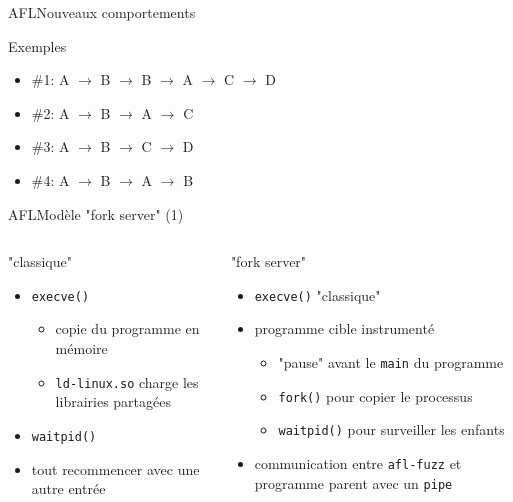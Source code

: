 \begin{frame}{AFL}{Nouveaux comportements}
  {\Large \centerline{Exemples}}

  \hspace{20.5cm}

  \begin{itemize}
    \item{\#1: A $\rightarrow$ B $\rightarrow$ B $\rightarrow$ A $\rightarrow$ C $\rightarrow$ D} \pause
    \item{\#2: A $\rightarrow$ B $\rightarrow$ A $\rightarrow$ C} \pause
    \item{\#3: A $\rightarrow$ B $\rightarrow$ C $\rightarrow$ D} \pause
    \item{\#4: A $\rightarrow$ B $\rightarrow$ A $\rightarrow$ B}
  \end{itemize}
\end{frame}

\begin{frame}{AFL}{Modèle "fork server" (1)}
  \begin{columns}[t]
    \begin{column}{0.49\textwidth}
      \begin{block}{"classique"}
        \begin{itemize}
        \item \lstinline{execve()}
          \begin{itemize}
          \item copie du programme en mémoire
          \item \lstinline{ld-linux.so} charge les librairies partagées
          \end{itemize}
        \item \lstinline{waitpid()}
        \item tout recommencer avec une autre entrée
        \end{itemize}
        \vspace{5.0ex}
      \end{block}
    \end{column}

    \begin{column}{0.49\textwidth}
      \begin{block}{"fork server"}
        \begin{itemize}
        \item \lstinline{execve()} "classique"
        \item programme cible instrumenté
          \begin{itemize}
          \item "pause" avant le \lstinline{main} du programme
          \item \lstinline{fork()} pour copier le processus
          \item \lstinline{waitpid()} pour surveiller les enfants
          \end{itemize}
        \item communication entre \lstinline{afl-fuzz} et programme parent avec un \lstinline{pipe}
        \end{itemize}
      \end{block}
    \end{column}
  \end{columns}
\end{frame}

